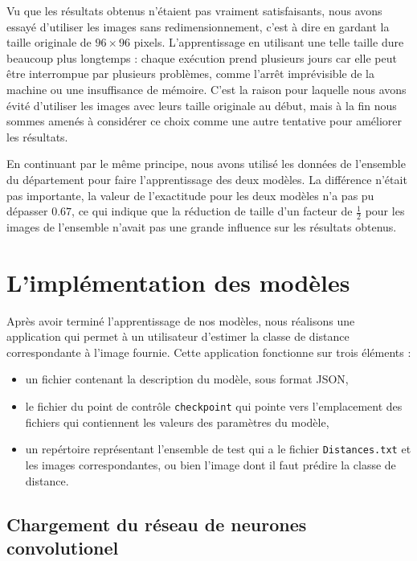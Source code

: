 Vu que les résultats obtenus n'étaient pas vraiment satisfaisants, nous avons essayé
d'utiliser les images sans redimensionnement, c'est à dire en gardant la taille
originale de $96 \times 96$ pixels. L'apprentissage en utilisant une telle taille
dure beaucoup plus longtemps : chaque exécution prend plusieurs jours car elle peut être
interrompue par plusieurs problèmes, comme l'arrêt imprévisible de la machine ou
une insuffisance de mémoire. C'est la raison pour laquelle nous avons évité
d'utiliser les images avec leurs taille originale au début, mais à la fin nous
sommes amenés à considérer ce choix comme une autre tentative pour améliorer les résultats.

En continuant par le même principe, nous avons utilisé les données de l'ensemble
du département pour faire l'apprentissage des deux modèles. La différence n'était
pas importante, la valeur de l'exactitude pour les deux modèles n'a pas pu
dépasser $0.67$, ce qui indique que la réduction de taille d'un facteur de $\frac{1}{2}$
pour les images de l'ensemble n'avait pas une grande influence sur les résultats obtenus.

\section{L'implémentation des modèles}

Après avoir terminé l'apprentissage de nos modèles, nous réalisons une
application qui permet à un utilisateur d'estimer la classe de distance correspondante
à l'image fournie. Cette application fonctionne sur trois éléments :

\begin{itemize}
  \item un fichier contenant la description du modèle, sous format JSON,
  \item le fichier du point de contrôle \texttt{checkpoint} qui pointe vers
  l'emplacement des fichiers qui contiennent les valeurs des paramètres du modèle,
  \item un repértoire représentant l'ensemble de test qui a le fichier \texttt{Distances.txt}
  et les images correspondantes, ou bien l'image dont il faut prédire la classe de distance.
\end{itemize}

\subsection{Chargement du réseau de neurones convolutionel}

